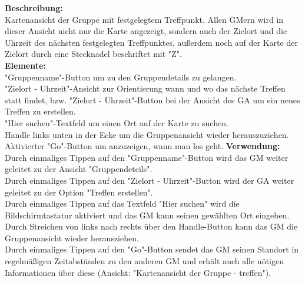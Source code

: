 \textbf{Beschreibung:}\\
Kartenansicht der Gruppe mit festgelegtem Treffpunkt. Allen GMern wird in dieser Ansicht nicht nur die Karte angezeigt, sondern auch der Zielort und die Uhrzeit des nächsten festgelegten Treffpunktes, außerdem noch auf der Karte der Zielort durch eine Stecknadel beschriftet mit "Z".\\
\textbf{Elemente:}\\
"Gruppenname"-Button um zu den Gruppendetails zu gelangen.\\
"Zielort - Uhrzeit"-Ansicht zur Orientierung wann und wo das nächste Treffen statt findet, bzw. "Zielort - Uhrzeit"-Button bei der Ansicht des GA um ein neues Treffen zu erstellen.\\
"Hier suchen"-Textfeld um einen Ort auf der Karte zu suchen.\\
Handle links unten in der Ecke um die Gruppenansicht wieder herauszuziehen.\\
Aktivierter "Go"-Button um anzuzeigen, wann man los geht.
\textbf{Verwendung:}\\
Durch einmaliges Tippen auf den "Gruppenname"-Button wird das GM weiter geleitet zu der Ansicht "Gruppendeteils".\\
Durch einmaliges Tippen auf den "Zielort - Uhrzeit"-Button wird der GA weiter geleitet zu der Option "Treffen erstellen".\\
Durch einmaliges Tippen auf das Textfeld "Hier suchen" wird die Bildschirmtastatur aktiviert und das GM kann seinen gewählten Ort eingeben.\\
Durch Streichen von links nach rechts über den Handle-Button kann das GM die Gruppenansicht wieder herausziehen.\\
Durch einmaliges Tippen auf den "Go"-Button sendet das GM seinen Standort in regelmäßigen Zeitabständen zu den anderen GM und erhält auch alle nötigen Informationen über diese (Ansicht: "Kartenansicht der Gruppe - treffen").
\clearpage
\newpage

